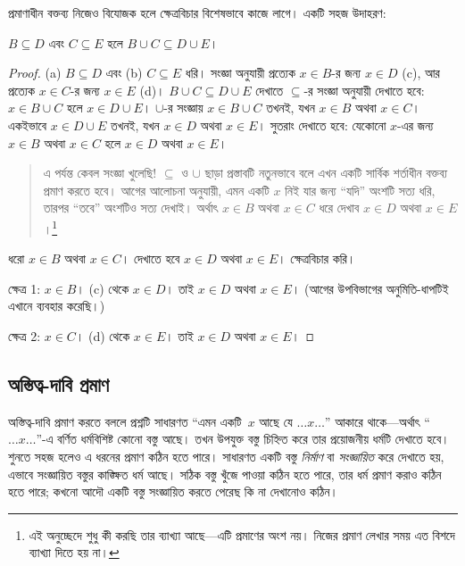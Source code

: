 \documentclass[../../../include/open-logic-section]{subfiles}
\begin{document}
প্রমাণাধীন বক্তব্য নিজেও বিযোজক হলে ক্ষেত্রবিচার
বিশেষভাবে কাজে লাগে। একটি সহজ উদাহরণ:

\begin{prop}
$B \subseteq D$ এবং $C \subseteq E$ হলে
$B \cup C \subseteq D \cup E$।
\end{prop}

\begin{proof}
  (a) $B \subseteq D$ এবং (b) $C \subseteq E$
  ধরি। সংজ্ঞা অনুযায়ী প্রত্যেক $x \in B$-র জন্য
  $x \in D$ (c), আর প্রত্যেক $x \in C$-র জন্য
  $x \in E$ (d)। $B \cup C \subseteq D \cup E$
  দেখাতে $\subseteq$-র সংজ্ঞা অনুযায়ী দেখাতে হবে:
  $x \in B \cup C$ হলে $x \in D \cup E$।
  $\cup$-র সংজ্ঞায় $x \in B \cup C$ তখনই, যখন
  $x \in B$ অথবা $x \in C$। একইভাবে
  $x \in D \cup E$ তখনই, যখন $x \in D$ অথবা
  $x \in E$। সুতরাং দেখাতে হবে: যেকোনো $x$-এর
  জন্য $x \in B$ অথবা $x \in C$ হলে $x \in D$
  অথবা $x \in E$।

  \begin{quote}
  এ পর্যন্ত কেবল সংজ্ঞা খুলেছি!{} $\subseteq$ ও
  $\cup$ ছাড়া প্রস্তাবটি নতুনভাবে বলে এখন একটি
  সার্বিক শর্তাধীন বক্তব্য প্রমাণ করতে হবে। আগের
  আলোচনা অনুযায়ী, এমন একটি $x$ নিই যার জন্য
  ``যদি'' অংশটি সত্য ধরি, তারপর ``তবে'' অংশটিও
  সত্য দেখাই। অর্থাৎ $x \in B$ অথবা $x \in C$
  ধরে দেখাব $x \in D$ অথবা $x \in
  E$।\footnote{এই অনুচ্ছেদে শুধু কী করছি তার
    ব্যাখ্যা আছে—এটি প্রমাণের অংশ নয়। নিজের
    প্রমাণ লেখার সময় এত বিশদে ব্যাখ্যা দিতে হয় না।}
  \end{quote}

  ধরো $x \in B$ অথবা $x \in C$। দেখাতে হবে
  $x \in D$ অথবা $x \in E$। ক্ষেত্রবিচার করি।

  ক্ষেত্র 1: $x \in B$। (c) থেকে $x \in D$।
  তাই $x \in D$ অথবা $x \in E$। (আগের
  উপবিভাগের অনুমিতি-ধাপটিই এখানে ব্যবহার করেছি।)

  ক্ষেত্র 2: $x \in C$। (d) থেকে $x \in E$।
  তাই $x \in D$ অথবা $x \in E$।
\end{proof}


\subsection{অস্তিত্ব-দাবি প্রমাণ}

অস্তিত্ব-দাবি প্রমাণ করতে বললে প্রশ্নটি সাধারণত
``এমন একটি~$x$ আছে যে $\dots x \dots$'' আকারে
থাকে—অর্থাৎ ``$\dots x \dots$''-এ বর্ণিত ধর্মবিশিষ্ট
কোনো বস্তু আছে। তখন উপযুক্ত বস্তু চিহ্নিত করে তার
প্রয়োজনীয় ধর্মটি দেখাতে হবে। শুনতে সহজ হলেও এ ধরনের
প্রমাণ কঠিন হতে পারে। সাধারণত একটি বস্তু
\emph{নির্মাণ} বা \emph{সংজ্ঞায়িত} করে দেখাতে হয়,
এভাবে সংজ্ঞায়িত বস্তুর কাঙ্ক্ষিত ধর্ম আছে। সঠিক বস্তু
খুঁজে পাওয়া কঠিন হতে পারে, তার ধর্ম প্রমাণ করাও কঠিন
হতে পারে; কখনো আদৌ একটি বস্তু সংজ্ঞায়িত করতে
পেরেছ কি না দেখানোও কঠিন।
\end{document}
